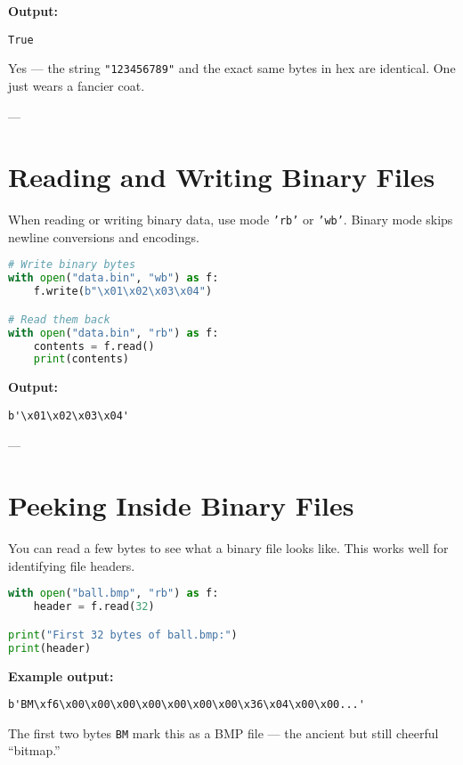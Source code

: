 \textbf{Output:}
\begin{verbatim}
True
\end{verbatim}

Yes — the string \texttt{"123456789"} and the exact same bytes in hex are identical.
One just wears a fancier coat.

---

\section{Reading and Writing Binary Files}

When reading or writing binary data, use mode \texttt{'rb'} or \texttt{'wb'}.
Binary mode skips newline conversions and encodings.

\begin{lstlisting}[language=Python, caption={Opening files in binary mode.}]
# Write binary bytes
with open("data.bin", "wb") as f:
    f.write(b"\x01\x02\x03\x04")

# Read them back
with open("data.bin", "rb") as f:
    contents = f.read()
    print(contents)
\end{lstlisting}

\textbf{Output:}
\begin{verbatim}
b'\x01\x02\x03\x04'
\end{verbatim}

---

\section{Peeking Inside Binary Files}

You can read a few bytes to see what a binary file looks like.
This works well for identifying file headers.

\begin{lstlisting}[language=Python, caption={Reading the first bytes of a file.}]
with open("ball.bmp", "rb") as f:
    header = f.read(32)

print("First 32 bytes of ball.bmp:")
print(header)
\end{lstlisting}

\textbf{Example output:}
\begin{verbatim}
b'BM\xf6\x00\x00\x00\x00\x00\x00\x00\x36\x04\x00\x00...'
\end{verbatim}

The first two bytes \texttt{BM} mark this as a BMP file —  
the ancient but still cheerful “bitmap.”

